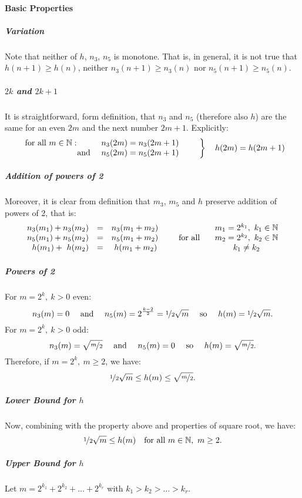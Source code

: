 \paragraph{Basic Properties}
\subparagraph{Variation}
Note that neither of $h$, $n_3$, $n_5$ is monotone.
That is, in general, it is not true that $h(n+1) \geq h(n)$, neither $n_3(n+1) \geq n_3(n)$ nor $n_5(n+1) \geq n_5(n)$.

\subparagraph{$2k$ and $2k+1$}
It is straightforward, form definition, that $n_3$ and $n_5$ (therefore also $h$) are the same for an even $2m$ and the next number $2m+1$.
Explicitly:
$$
\left. 
\begin{array}{rc}
	\text{for all } m \in \mathbb{N}: \qquad & n_3(2m) = n_3(2m+1) \\
	\text{ and } & n_5(2m) = n_5(2m+1) \\
\end{array} 
\qquad \right\rbrace \quad h(2m) = h(2m+1)
$$

\subparagraph{Addition of powers of 2}
Moreover, it is clear from definition that $m_3$, $m_5$ and $h$ preserve addition of powers of 2, that is:
$$
\begin{array}{rcl}
	n_3(m_1) + n_3(m_2) &=& n_3(m_1+m_2) \\
	n_5(m_1) + n_5(m_2) &=& n_5(m_1+m_2) \\
	  h(m_1) + \ h(m_2) &=& \ h(m_1+m_2) \\
\end{array}
\qquad \text{for all } \quad
\begin{array}{c}
	m_1=2^{k_1}, \ k_1 \in \mathbb{N} \\
	m_2=2^{k_2}, \ k_2 \in \mathbb{N} \\
	k_1 \neq k_2
\end{array}
$$

\subparagraph{Powers of 2}
For $m=2^k, \ k>0$ even: 
$$
n_3(m) = 0 
\quad \text{ and } \quad 
n_5(m) = 2^{\frac{k-2}{2}} = \nicefrac{1}{2}\sqrt{m}
\quad \text{ so } \quad 
h(m) = \nicefrac{1}{2}\sqrt{m}.
$$
For $m=2^k, \ k>0$ odd: 
$$
n_3(m) = \sqrt{\nicefrac{m}{2}}
\quad \text{ and } \quad 
n_5(m) = 0
\quad \text{ so } \quad 
h(m) = \sqrt{\nicefrac{m}{2}}.
$$
Therefore, if $m=2^k, \ m \geq 2$, we have:
$$
\nicefrac{1}{2}\sqrt{m} \leq h(m) \leq \sqrt{\nicefrac{m}{2}}.
$$

\subparagraph{Lower Bound for $h$}
Now, combining with the property above and properties of square root, we have:
$$
\nicefrac{1}{2}\sqrt{m} \leq h(m) \quad \text{for all } m \in \mathbb{N}, \ m \geq 2.
$$

\subparagraph{Upper Bound for $h$}
Let $m = 2^{k_1} + 2^{k_2} + \dots + 2^{k_r}$ with $k_1 > k_2 > \dots > k_r$.

